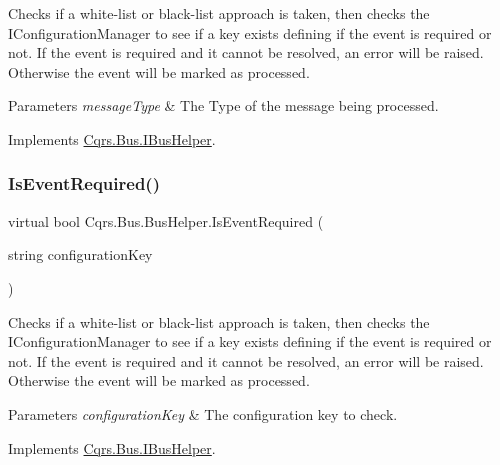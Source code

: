 Checks if a white-\/list or black-\/list approach is taken, then checks the I\+Configuration\+Manager to see if a key exists defining if the event is required or not. If the event is required and it cannot be resolved, an error will be raised. Otherwise the event will be marked as processed. 


\begin{DoxyParams}{Parameters}
{\em message\+Type} & The Type of the message being processed.\\
\hline
\end{DoxyParams}


Implements \hyperlink{interfaceCqrs_1_1Bus_1_1IBusHelper_acddf7635d6de08e3b09d552361fe4fda}{Cqrs.\+Bus.\+I\+Bus\+Helper}.

\mbox{\label{classCqrs_1_1Bus_1_1BusHelper_a60a9603d5c6b7f29ee42491475714895}} 
\subsubsection{\texorpdfstring{Is\+Event\+Required()}{IsEventRequired()}\hspace{0.1cm}{\footnotesize\ttfamily [2/2]}}
{\footnotesize\ttfamily virtual bool Cqrs.\+Bus.\+Bus\+Helper.\+Is\+Event\+Required (\begin{DoxyParamCaption}\item[{string}]{configuration\+Key }\end{DoxyParamCaption})\hspace{0.3cm}{\ttfamily [virtual]}}



Checks if a white-\/list or black-\/list approach is taken, then checks the I\+Configuration\+Manager to see if a key exists defining if the event is required or not. If the event is required and it cannot be resolved, an error will be raised. Otherwise the event will be marked as processed. 


\begin{DoxyParams}{Parameters}
{\em configuration\+Key} & The configuration key to check.\\
\hline
\end{DoxyParams}


Implements \hyperlink{interfaceCqrs_1_1Bus_1_1IBusHelper_af73d0d2aa8e98566acb4b2fb13a3e986}{Cqrs.\+Bus.\+I\+Bus\+Helper}.

